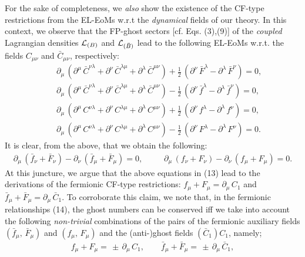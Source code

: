 \documentclass[12pt]{article}
\begin{document}
For the sake of completeness, we {\it also} show the existence of the CF-type restrictions from the EL-EoMs w.r.t the {\it dynamical} fields of 
our theory. In this context, we observe that the FP-ghost sectors [cf. Eqs. (3),(9)] of the
{\it coupled} Lagrangian densities ${\cal L}_{(B)} $ and ${\cal L}_{(\bar B)} $ lead to the following EL-EoMs 
w.r.t. the fields $C_{\mu\nu}$ and $ \bar C_{\mu\nu}$, respectively: 
\begin{eqnarray}\label{13}
&&\partial_\mu\, (\partial^\mu\, \bar C^{\nu\lambda} + \partial^\nu\, \bar C^{\lambda\mu} + \partial^\lambda\, \bar C^{\mu\nu})
+ \frac{1}{2}\, (\partial^\nu\, \bar{F}^\lambda - \partial^\lambda \, \bar F^\nu) = 0, \nonumber\\
&&\partial_\mu\, (\partial^\mu\, \bar C^{\nu\lambda} + \partial^\nu\, \bar C^{\lambda\mu} + \partial^\lambda\, \bar C^{\mu\nu})
- \frac{1}{2}\, (\partial^\nu\, \bar{f}^\lambda - \partial^\lambda \, \bar f^\nu) = 0, \nonumber\\
&&\partial_\mu\, (\partial^\mu\,  C^{\nu\lambda} + \partial^\nu\,  C^{\lambda\mu} + \partial^\lambda\,  C^{\mu\nu})
+ \frac{1}{2}\, (\partial^\nu\, {f}^\lambda - \partial^\lambda \,  f^\nu) = 0, \nonumber\\
&&\partial_\mu\, (\partial^\mu\,  C^{\nu\lambda} + \partial^\nu\,  C^{\lambda\mu} + \partial^\lambda\,  C^{\mu\nu})
- \frac{1}{2}\, (\partial^\nu\, {F}^\lambda - \partial^\lambda \,  F^\nu) = 0. 
\end{eqnarray}
It is clear, from the above, that we obtain the following: 
\begin{eqnarray}\label{14}
\partial_\mu\, (\bar f_\nu + \bar F_\nu) - \partial_\nu\,(\bar f_\mu + \bar F_\mu) = 0, \;\qquad \;
\partial_\mu\, (f_\nu + F_\nu) - \partial_\nu\,(f_\mu + F_\mu) = 0.
\end{eqnarray}
At this juncture, we argue that the above equations in (13) lead to the derivations of the fermionic CF-type restrictions: 
$f_\mu + F_\mu = \partial_\mu\, C_1$ and $\bar f_\mu + \bar F_\mu = \partial_\mu\, \bar C_1$. 
To corroborate this claim, we note that, in the fermionic relationships  (14), the ghost numbers can be conserved iff we take into 
account the following {\it non-trivial} 
combinations of the pairs of the fermionic auxiliary fields $(\bar f_\mu, \, \bar F_\mu)$ and $(f_\mu, \,  F_\mu)$  and the 
(anti-)ghost fields $(\bar C_1)C_1$, namely; 
\begin{eqnarray}\label{15}
f_\mu + F_\mu =  \,\pm \, \partial_\mu\, C_1, \qquad  \bar f_\mu + \bar F_\mu =\,\pm \, \partial_\mu\, \bar C_1, 
\end{eqnarray}
\end{document}
